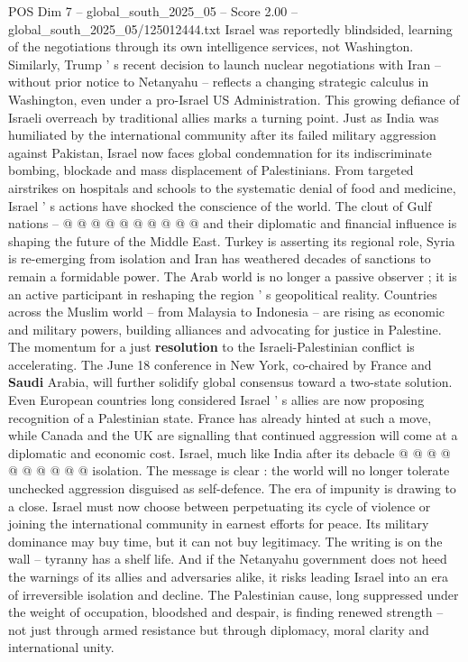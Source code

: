 \begin{textsample}{POS Dim 7 – global\_south\_2025\_05 – Score 2.00 – global\_south\_2025\_05/125012444.txt}
Israel was reportedly blindsided, learning of the negotiations through its own intelligence services, not Washington.
Similarly, Trump ' s recent decision to launch nuclear negotiations with Iran -- without prior notice to Netanyahu -- reflects a changing strategic calculus in Washington, even under a pro-Israel US Administration.
This growing defiance of Israeli overreach by traditional allies marks a turning point.
Just as India was humiliated by the international community after its failed military aggression against Pakistan, Israel now faces global condemnation for its indiscriminate bombing, blockade and mass displacement of Palestinians.
From targeted airstrikes on hospitals and schools to the systematic denial of food and medicine, Israel ' s actions have shocked the conscience of the world.
The clout of Gulf nations -- @ @ @ @ @ @ @ @ @ @ and their diplomatic and financial influence is shaping the future of the Middle East.
Turkey is asserting its regional role, Syria is re-emerging from isolation and Iran has weathered decades of sanctions to remain a formidable power.
The Arab world is no longer a passive observer ; it is an active participant in reshaping the region ' s geopolitical reality.
Countries across the Muslim world -- from Malaysia to Indonesia -- are rising as economic and military powers, building alliances and advocating for justice in Palestine.
The momentum for a just \textbf{resolution} to the Israeli-Palestinian conflict is accelerating.
The June 18 conference in New York, co-chaired by France and \textbf{Saudi} Arabia, will further solidify global consensus toward a two-state solution.
Even European countries long considered Israel ' s allies are now proposing recognition of a Palestinian state.
France has already hinted at such a move, while Canada and the UK are signalling that continued aggression will come at a diplomatic and economic cost.
Israel, much like India after its debacle @ @ @ @ @ @ @ @ @ @ isolation.
The message is clear : the world will no longer tolerate unchecked aggression disguised as self-defence.
The era of impunity is drawing to a close.
Israel must now choose between perpetuating its cycle of violence or joining the international community in earnest efforts for peace.
Its military dominance may buy time, but it can not buy legitimacy.
The writing is on the wall -- tyranny has a shelf life.
And if the Netanyahu government does not heed the warnings of its allies and adversaries alike, it risks leading Israel into an era of irreversible isolation and decline.
The Palestinian cause, long suppressed under the weight of occupation, bloodshed and despair, is finding renewed strength -- not just through armed resistance but through diplomacy, moral clarity and international unity.

\end{textsample}
